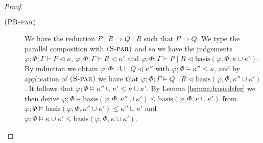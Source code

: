 \begin{theorem}
\begin{proof}
\begin{description}
    \item[$\mbox{\textsc{\protect{(PR-par})}}$] We have the reduction $P \mid R \Longrightarrow Q \mid R$ such that $P \Longrightarrow Q$. We type the parallel composition with $\mbox{\textsc{\protect{(S-par})}}$ and so we have the judgements $\varphi;\Phi;\Gamma\vdash P \triangleleft \kappa$,  $\varphi;\Phi;\Gamma\vdash R \triangleleft \kappa'$ and $\varphi;\Phi;\Gamma\vdash P \mid R \triangleleft \text{basis}(\varphi,\Phi,\kappa\cup\kappa')$. By induction we obtain $\varphi;\Phi;\Delta\vdash Q \triangleleft \kappa''$ with $\varphi;\Phi\vDash \kappa'' \leq \kappa$, and by application of $\mbox{\textsc{\protect{(S-par})}}$ we have that $\varphi;\Phi;\Gamma\vDash Q \mid R \triangleleft \text{basis}(\varphi,\Phi,\kappa''\cup\kappa')$. It follows that $\varphi;\Phi\vDash \kappa'' \cup \kappa' \leq \kappa \cup \kappa'$. By Lemma \ref{lemma:basisdefer} we then derive $\varphi;\Phi\vDash \text{basis}(\varphi,\Phi,\kappa''\cup \kappa') \leq \text{basis}(\varphi,\Phi,\kappa\cup\kappa')$ from $\varphi;\Phi\vDash \text{basis}(\varphi,\Phi,\kappa''\cup\kappa')\leq \kappa''\cup\kappa'$ and $\varphi;\Phi\vDash \kappa\cup\kappa' \leq \text{basis}(\varphi,\Phi,\kappa\cup\kappa')$.

\end{description}
\end{proof}
\end{theorem}
